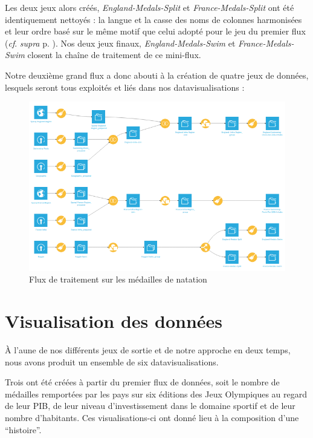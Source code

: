 \documentclass[hidelinks, 12pt]{report}
\begin{document}
Les deux jeux alors créés, \textit{England-Medals-Split} et \textit{France-Medals-Split} ont été identiquement nettoyés : la langue et la casse des noms de colonnes harmonisées et leur ordre basé sur le même motif que celui adopté pour le jeu du premier flux (\textit{cf}. \textit{supra} p. \pageref{orga}). Nos deux jeux finaux, \textit{England-Medals-Swim} et \textit{France-Medals-Swim} closent la chaîne de traitement de ce mini-flux.

Notre deuxième grand flux a donc abouti à la création de quatre jeux de données, lesquels seront tous exploités et liés dans nos datavisualisations :

\begin{center}
	\begin{figure}[H]
		\centering
		\setlength{\belowcaptionskip}{-35pt}
		\includegraphics[scale=0.5]{images/flow-swim-full.png}
		\caption{Flux de traitement sur les médailles de natation}
	\end{figure}
\end{center}





%





\chapter{Visualisation des données}

À l'aune de nos différents jeux de sortie et de notre approche en deux temps, nous avons produit un ensemble de six datavisualisations.

Trois ont été créées à partir du premier flux de données, soit le nombre de médailles remportées par les pays sur six éditions des Jeux Olympiques au regard de leur PIB, de leur niveau d'investissement dans le domaine sportif et de leur nombre d'habitants. Ces visualisations-ci ont donné lieu à la composition d'une \enquote{histoire}\autocite{vismap}.
\end{document}

